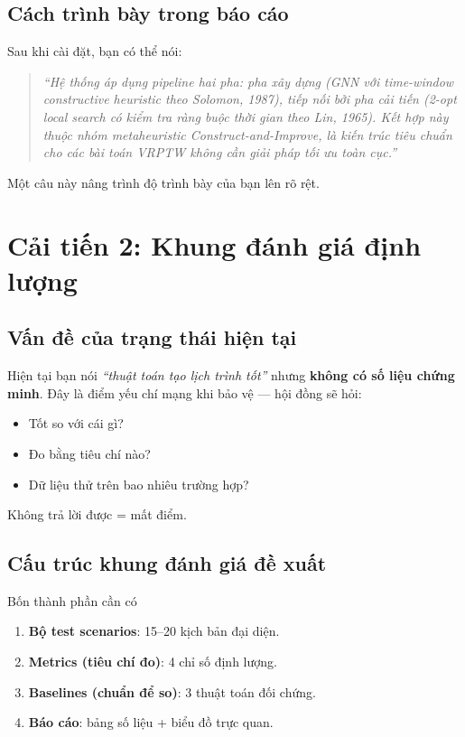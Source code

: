 \documentclass[12pt,a4paper]{report}
\begin{document}
\section{Cách trình bày trong báo cáo}

Sau khi cài đặt, bạn có thể nói:
\begin{quote}
\textit{``Hệ thống áp dụng pipeline hai pha: pha xây dựng (GNN với time-window constructive heuristic theo Solomon, 1987), tiếp nối bởi pha cải tiến (2-opt local search có kiểm tra ràng buộc thời gian theo Lin, 1965). Kết hợp này thuộc nhóm metaheuristic Construct-and-Improve, là kiến trúc tiêu chuẩn cho các bài toán VRPTW không cần giải pháp tối ưu toàn cục.''}
\end{quote}

Một câu này nâng trình độ trình bày của bạn lên rõ rệt.

\chapter{Cải tiến 2: Khung đánh giá định lượng}
\label{chap:eval}

\section{Vấn đề của trạng thái hiện tại}

Hiện tại bạn nói \textit{``thuật toán tạo lịch trình tốt''} nhưng \textbf{không có số liệu chứng minh}. Đây là điểm yếu chí mạng khi bảo vệ --- hội đồng sẽ hỏi:
\begin{itemize}
    \item Tốt so với cái gì?
    \item Đo bằng tiêu chí nào?
    \item Dữ liệu thử trên bao nhiêu trường hợp?
\end{itemize}

Không trả lời được = mất điểm.

\section{Cấu trúc khung đánh giá đề xuất}

\begin{ideabox}{Bốn thành phần cần có}
\begin{enumerate}
    \item \textbf{Bộ test scenarios}: 15--20 kịch bản đại diện.
    \item \textbf{Metrics (tiêu chí đo)}: 4 chỉ số định lượng.
    \item \textbf{Baselines (chuẩn để so)}: 3 thuật toán đối chứng.
    \item \textbf{Báo cáo}: bảng số liệu + biểu đồ trực quan.
\end{enumerate}
\end{ideabox}
\end{document}
